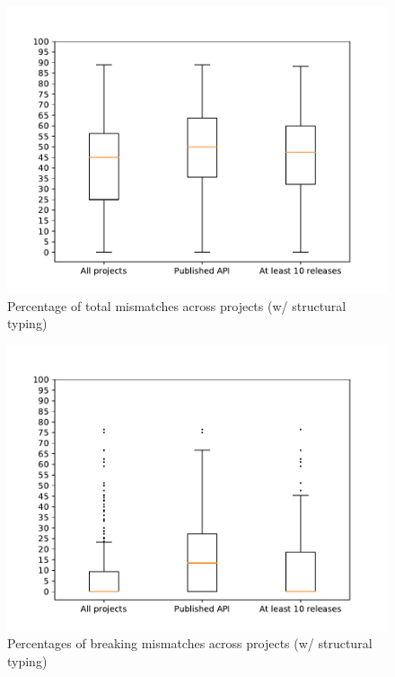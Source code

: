 \documentclass{l4proj}
\begin{document}
\begin{appendices}
\begin{figure}[]
\centering
\caption{Percentage of total mismatches across projects (w/ structural
typing)}
\label{StrBoxplotsMismatches}
\includegraphics[height=0.4\textheight]
{images/evaluation/str_boxplots_mismatches}
\end{figure}

\begin{figure}[]
\centering
\caption{Percentages of breaking mismatches across projects (w/
structural typing)}
\label{StrBoxplotsBreaking}
\includegraphics[height=0.4\textheight]
{images/evaluation/str_boxplots_breaking}
\end{figure}


\end{appendices}
\end{document}
